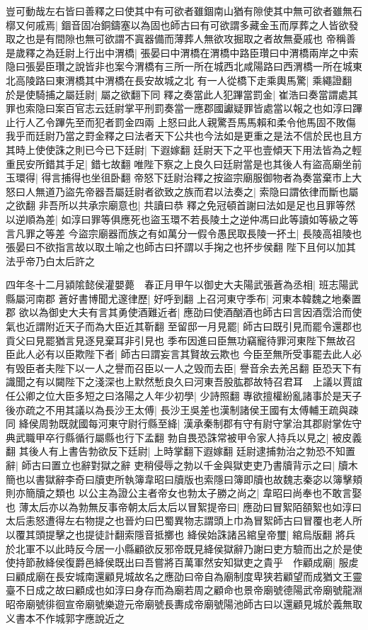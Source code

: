 豈可動哉左右皆曰善釋之曰使其中有可欲者雖錮南山猶有隙使其中無可欲者雖無石槨又何戚焉|{
	錮音固冶銅鑄塞以為固也師古曰有可欲謂多藏金玉而厚葬之人皆欲發取之也是有間隙也無可欲謂不寘器備而薄葬人無欲攻掘取之者故無憂戚也}
帝稱善是歲釋之為廷尉上行出中渭橋|{
	張晏曰中渭橋在渭橋中路臣瓚曰中渭橋兩岸之中索隐曰張晏臣瓚之說皆非也案今渭橋有三所一所在城西北咸陽路曰西渭橋一所在城東北高陵路曰東渭橋其中渭橋在長安故城之北}
有一人從橋下走乘輿馬驚|{
	乘繩證翻}
於是使騎捕之屬廷尉|{
	屬之欲翻下同}
釋之奏當此人犯蹕當罰金|{
	崔浩曰奏當謂處其罪也索隐曰案百官志云廷尉掌平刑罰奏當一應郡國讞疑罪皆處當以報之也如淳曰蹕止行人乙令蹕先至而犯者罰金四兩}
上怒曰此人親驚吾馬馬賴和柔令他馬固不敗傷我乎而廷尉乃當之罸金釋之曰法者天下公共也今法如是更重之是法不信於民也且方其時上使使誅之則已今已下廷尉|{
	下遐嫁翻}
廷尉天下之平也壹傾天下用法皆為之輕重民安所錯其手足|{
	錯七故翻}
唯陛下察之上良久曰廷尉當是也其後人有盜高廟坐前玉環得|{
	得言捕得也坐徂卧翻}
帝怒下廷尉治釋之按盜宗廟服御物者為奏當棄市上大怒曰人無道乃盜先帝器吾屬廷尉者欲致之族而君以法奏之|{
	索隐曰謂依律而斷也屬之欲翻}
非吾所以共承宗廟意也|{
	共讀曰恭}
釋之免冠頓首謝曰法如是足也且罪等然以逆順為差|{
	如淳曰罪等俱應死也盜玉環不若長陵土之逆仲馮曰此等讀如等級之等言凡罪之等差}
今盜宗廟器而族之有如萬分一假令愚民取長陵一抔土|{
	長陵高祖陵也張晏曰不欲指言故以取土喻之也師古曰抔謂以手掬之也抔步侯翻}
陛下且何以加其法乎帝乃白太后許之

四年冬十二月潁隂懿侯灌嬰薨　春正月甲午以御史大夫陽武張蒼為丞相|{
	班志陽武縣屬河南郡}
蒼好書博聞尤邃律歷|{
	好呼到翻}
上召河東守季布|{
	河東本韓魏之地秦置郡}
欲以為御史大夫有言其勇使酒難近者|{
	應劭曰使酒酗酒也師古曰言因酒霑洽而使氣也近謂附近天子而為大臣近其靳翻}
至留邸一月見罷|{
	師古曰既引見而罷令還郡也貢父曰見罷猶言見逐見棄耳非引見也}
季布因進曰臣無功竊寵待罪河東陛下無故召臣此人必有以臣欺陛下者|{
	師古曰謂妄言其賢故云欺也}
今臣至無所受事罷去此人必有毁臣者夫陛下以一人之譽而召臣以一人之毁而去臣|{
	譽音余去羌呂翻}
臣恐天下有識聞之有以闚陛下之淺深也上默然慙良久曰河東吾股肱郡故特召君耳　上議以賈誼任公卿之位大臣多短之曰洛陽之人年少初學|{
	少詩照翻}
專欲擅權紛亂諸事於是天子後亦疏之不用其議以為長沙王太傅|{
	長沙王吳差也漢制諸侯王國有太傅輔王疏與疎同}
絳侯周勃既就國每河東守尉行縣至絳|{
	漢承秦制郡有守有尉守掌治其郡尉掌佐守典武職甲卒行縣循行屬縣也行下孟翻}
勃自畏恐誅常被甲令家人持兵以見之|{
	被皮義翻}
其後人有上書告勃欲反下廷尉|{
	上時掌翻下遐嫁翻}
廷尉逮捕勃治之勃恐不知置辭|{
	師古曰置立也辭對獄之辭}
吏稍侵辱之勃以千金與獄吏吏乃書牘背示之曰|{
	牘木簡也以書獄辭李奇曰牘吏所執簿韋昭曰牘版也索隱曰簿即牘也故魏志秦宓以簿擊頬則亦簡牘之類也}
以公主為證公主者帝女也勃太子勝之尚之|{
	韋昭曰尚奉也不敢言娶也}
薄太后亦以為勃無反事帝朝太后太后以冒絮提帝曰|{
	應劭曰冒絮陌頟絮也如淳曰太后恚怒遭得左右物提之也晉灼曰巴蜀異物志謂頭上巾為冒絮師古曰冒覆也老人所以覆其頭提擊之也提徒計翻索隱音抵擲也}
絳侯始誅諸呂綰皇帝璽|{
	綰烏版翻}
將兵於北軍不以此時反今居一小縣顧欲反邪帝既見絳侯獄辭乃謝曰吏方驗而出之於是使使持節赦絳侯復爵邑絳侯既出曰吾嘗將百萬軍然安知獄吏之貴乎　作顧成廟|{
	服䖍曰顧成廟在長安城南還顧見城故名之應劭曰帝自為廟制度卑狭若顧望而成猶文王靈臺不日成之故曰顧成也如淳曰身存而為廟若周之顧命也景帝廟號德陽武帝廟號龍淵昭帝廟號徘徊宣帝廟號樂遊元帝廟號長夀成帝廟號陽池師古曰以還顧見城於義無取义書本不作城郭字應說近之}


